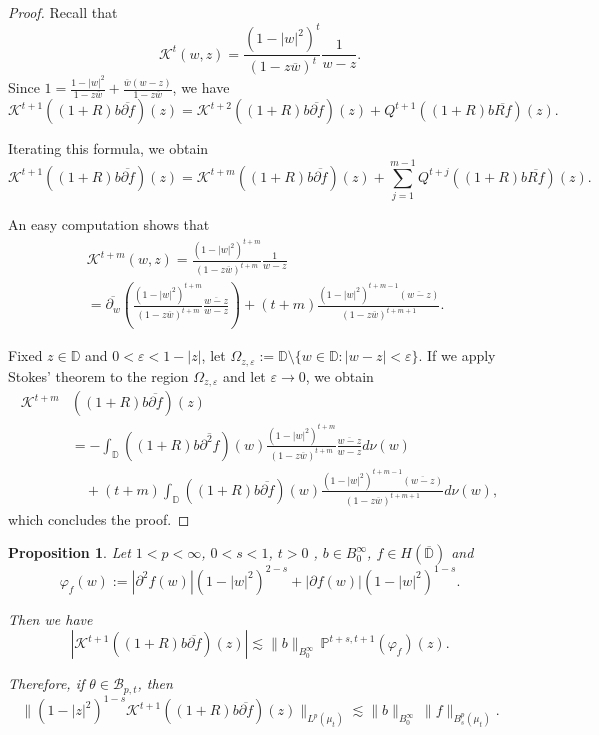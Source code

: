 \documentclass[12pt,twoside,leqno,final]{amsart}
\theoremstyle{plain}
\newtheorem{prop}[thm]{Proposition}
\begin{document}
\begin{proof}
Recall that 
$$
{{\mathcal K}}^{t}(w,z)=\frac{(1-|w|^2)^{t}}{(1-z\overline w)^{t}}\frac{1}{w-z}.
$$
Since $1=\frac{1-|w|^2}{1-z\overline w}+\frac{\overline w(w-z)}{1-z\overline w}$, we have
$$
{{\mathcal K}}^{t+1}((1+R)b\overline {{\partial} f})(z)={{\mathcal K}}^{t+2}((1+R)b\overline {{\partial} f})(z)+Q^{t+1}((1+R)b\overline {R f})(z).
$$

Iterating this formula, we obtain 
$$
{{\mathcal K}}^{t+1}((1+R)b\overline {{\partial} f})(z)={{\mathcal K}}^{t+m}((1+R)b\overline {{\partial} f})(z)
+\sum_{j=1}^{m-1} Q^{t+j}((1+R)b\overline {R f})(z).
$$

An easy computation shows that
\begin{align*}
&{{\mathcal K}}^{t+m}(w,z)=\frac{(1-|w|^2)^{t+m}}{(1-z\overline w)^{t+m}}\frac{1}{w-z}\\
&=\overline{{\partial}_w}\left(\frac{(1-|w|^2)^{t+m}}{(1-z\overline w)^{t+m}}\frac{\overline{w-z}}{w-z}\right)
+(t+m)\frac{(1-|w|^2)^{t+m-1}(\overline{w-z})}{(1-z\overline w)^{t+m+1}}.
\end{align*}

Fixed $z\in{{\mathbb D}}$ and $0<{\varepsilon}< 1-|z|$, let $\Omega_{z,{\varepsilon}}:={{\mathbb D}}\setminus \{w\in{{\mathbb D}}:|w-z|<{\varepsilon}\}$. If we apply  Stokes' theorem to the region $\Omega_{z,{\varepsilon}}$ and let ${\varepsilon}\to 0$, we obtain 
\begin{align*}
{{\mathcal K}}^{t+m}&((1+R)b\overline{{\partial} f})(z)\\
&=-\int_{{\mathbb D}} ((1+R)b\overline{{\partial}^2 f})(w)\frac{(1-|w|^2)^{t+m}}{(1-z\overline w)^{t+m}}\frac{\overline{w-z}}{w-z}d\nu(w)\\
&\quad +(t+m)\int_{{\mathbb D}} ((1+R)b\overline{{\partial} f})(w)\frac{(1-|w|^2)^{t+m-1}(\overline{w-z})}
{(1-z\overline w)^{t+m+1}}d\nu(w),
\end{align*}
which concludes the proof.
\end{proof}

\begin{prop} \label{prop:KN}
Let $1< p<\infty$, $0<s<1$, $t> 0$ , $b\in B^\infty_0$, $f\in H(\overline{{\mathbb D}})$ and 
$$
\varphi_f(w):=|{\partial}^2 f(w)|(1-|w|^2)^{2-s}+|{\partial} f(w)|(1-|w|^2)^{1-s}.
$$

 Then we have 
\begin{equation}\label{eqn:KN1}
|{{\mathcal K}}^{t+1}((1+R)b\overline {{\partial} f})(z)| 
\lesssim \|b\|_{B^\infty_0}\,{\mathbb{P}}^{t+s,t+1}\left( \varphi_f \right)(z).
\end{equation}

Therefore, if $\theta\in {{\mathcal B}}_{p,t}$, then 
\begin{equation}\label{eqn:KN2}
\|(1-|z|^2)^{1-s}{{\mathcal K}}^{t+1}((1+R)b\overline {{\partial} f})(z)\|_{L^p(\mu_t)}\lesssim \|b\|_{B^\infty_0}\,\|f\|_{B^p_s(\mu_t)}.
\end{equation}
\end{prop}
\end{document}

